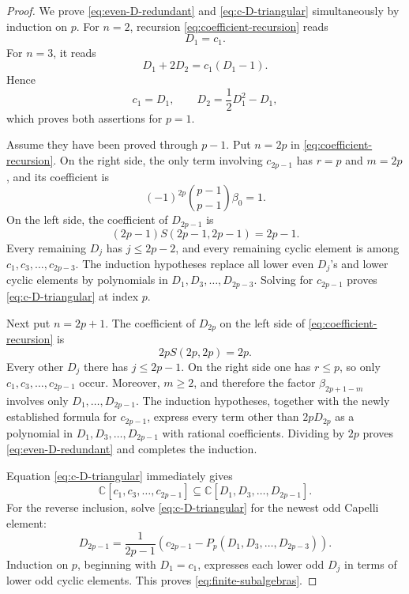 \documentclass[11pt]{amsart}
\numberwithin{equation}{section}
\theoremstyle{definition}
\theoremstyle{remark}
\newcommand{\C}{\mathbb C}
\begin{document}
\begin{proof}
We prove \eqref{eq:even-D-redundant} and
\eqref{eq:c-D-triangular} simultaneously by induction on \(p\).
For \(n=2\), recursion \eqref{eq:coefficient-recursion} reads
\[
 D_1=c_1.
\]
For \(n=3\), it reads
\[
 D_1+2D_2=c_1(D_1-1).
\]
Hence
\begin{equation}
 c_1=D_1,
 \qquad
 D_2=\frac12D_1^2-D_1,
 \label{eq:base-low}
\end{equation}
which proves both assertions for \(p=1\).

Assume they have been proved through \(p-1\).  Put \(n=2p\) in
\eqref{eq:coefficient-recursion}.  On the right side, the only term
involving \(c_{2p-1}\) has \(r=p\) and \(m=2p\), and its coefficient is
\[
 (-1)^{2p}\binom{p-1}{p-1}\beta_0=1.
\]
On the left side, the coefficient of \(D_{2p-1}\) is
\[
 (2p-1)S(2p-1,2p-1)=2p-1.
\]
Every remaining \(D_j\) has \(j\leq2p-2\), and every remaining cyclic
element is among \(c_1,c_3,\ldots,c_{2p-3}\).  The induction
hypotheses replace all lower even \(D_j\)'s and lower cyclic elements
by polynomials in \(D_1,D_3,\ldots,D_{2p-3}\).  Solving for
\(c_{2p-1}\) proves \eqref{eq:c-D-triangular} at index \(p\).

Next put \(n=2p+1\).  The coefficient of \(D_{2p}\) on the left side
of \eqref{eq:coefficient-recursion} is
\[
 2pS(2p,2p)=2p.
\]
Every other \(D_j\) there has \(j\leq2p-1\).  On the right side one
has \(r\leq p\), so only \(c_1,c_3,\ldots,c_{2p-1}\) occur.  Moreover,
\(m\geq2\), and therefore the factor \(\beta_{2p+1-m}\) involves only
\(D_1,\ldots,D_{2p-1}\).  The induction hypotheses, together with the
newly established formula for \(c_{2p-1}\), express every term other
than \(2pD_{2p}\) as a polynomial in
\(D_1,D_3,\ldots,D_{2p-1}\) with rational coefficients.  Dividing by
\(2p\) proves \eqref{eq:even-D-redundant} and completes the induction.

Equation \eqref{eq:c-D-triangular} immediately gives
\[
 \C[c_1,c_3,\ldots,c_{2p-1}]
 \subseteq\C[D_1,D_3,\ldots,D_{2p-1}].
\]
For the reverse inclusion, solve \eqref{eq:c-D-triangular} for the
newest odd Capelli element:
\[
 D_{2p-1}=\frac{1}{2p-1}
 \left(c_{2p-1}-P_p(D_1,D_3,\ldots,D_{2p-3})\right).
\]
Induction on \(p\), beginning with \(D_1=c_1\), expresses each lower
odd \(D_j\) in terms of lower odd cyclic elements.  This proves
\eqref{eq:finite-subalgebras}.
\end{proof}
\end{document}
